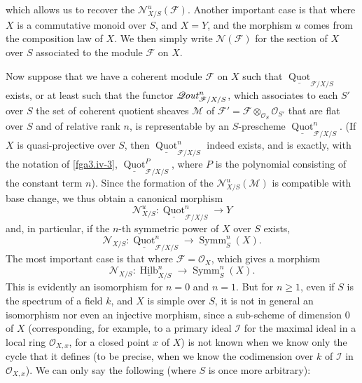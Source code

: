   which allows us to recover the \(\mathscr {N}_{X/S}^u(\mathscr {F})\).
  Another important case is that where \(X\) is a commutative monoid over \(S\), and \(X=Y\), and the morphism \(u\) comes from the composition law of \(X\).
  We then simply write \(\mathscr {N}(\mathscr {F})\) for the section of \(X\) over \(S\) associated to the module \(\mathscr {F}\) on \(X\).\par{}Now suppose that we have a coherent module \(\mathscr {F}\) on \(X\) such that \(\underline {\operatorname {Quot}}_{{\mathscr {F}/X/S}}\) exists, or at least such that the functor \(\mathscr {Q}\kern  -.75pt\mathit {out}_{{\mathscr {F}/X/S}}^n\), which associates to each \(S'\) over \(S\) the set of coherent quotient sheaves \(\mathscr {M}\) of \(\mathscr {F}'=\mathscr {F}\otimes _{\mathcal {O}_S}\mathcal {O}_{S'}\) that are flat over \(S\) and of relative rank \(n\), is representable by an \(S\)-prescheme \(\underline {\operatorname {Quot}}_{{\mathscr {F}/X/S}}^n\).
  (If \(X\) is quasi-projective over \(S\), then \(\underline {\operatorname {Quot}}_{{\mathscr {F}/X/S}}^n\) indeed exists, and is exactly, with the notation of \cref{fga3.iv-3}, \(\underline {\operatorname {Quot}}_{{\mathscr {F}/X/S}}^P\), where \(P\) is the polynomial consisting of the constant term \(n\)).
  Since the formation of the \(\mathscr {N}_{X/S}^u(\mathscr {M})\) is compatible with base change, we thus obtain a canonical morphism
  \[     \mathscr {N}_{X/S}^u\colon  \underline {\operatorname {Quot}}_{{\mathscr {F}/X/S}}^n \to  Y   \]
  and, in particular, if the \(n\)-th symmetric power of \(X\) over \(S\) exists,
  \[     \mathscr {N}_{X/S}\colon  \underline {\operatorname {Quot}}_{{\mathscr {F}/X/S}}^n \to  \operatorname {Symm}_S^n(X).   \]
  The most important case is that where \(\mathscr {F}=\mathcal {O}_X\), which gives a morphism
  \[     \mathscr {N}_{X/S}\colon  \underline {\operatorname {Hilb}}_{X/S}^n \to  \operatorname {Symm}_S^n(X).   \]
  This is evidently an isomorphism for \(n=0\) and \(n=1\).
  But for \(n\geqslant 1\), even if \(S\) is the spectrum of a field \(k\), and \(X\) is simple over \(S\), it is not in general an isomorphism nor even an injective morphism, since a sub-scheme of dimension \(0\) of \(X\) (corresponding, for example, to a primary ideal \(\mathscr {I}\) for the maximal ideal in a local ring \(\mathcal {O}_{X,x}\), for a closed point \(x\) of \(X\)) is not known when we know only the cycle that it defines (to be precise, when we know the codimension over \(k\) of \(\mathscr {I}\) in \(\mathcal {O}_{X,x}\)).
  We can only say the following (where \(S\) is once more arbitrary):

